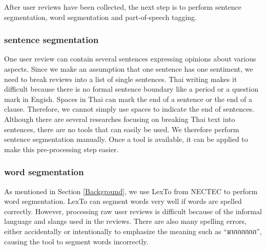 After user reviews have been collected, the next step is to perform sentence segmentation, word segmentation and part-of-speech tagging. 

\subsubsection{sentence segmentation}
One user review can contain several sentences expressing opinions about various aspects. 
Since we make an assumption that one sentence has one sentiment, we need to break reviews into a list of single sentences. Thai writing makes it difficult because there is no formal sentence boundary like a period or a question mark in Engish. Spaces in Thai can mark the end of a sentence or the end of a clause. Therefore, we cannot simply use spaces to indicate the end of sentences. Although there are several researches focusing on breaking Thai text into sentences, there are no tools that can easily be used. We therefore perform sentence segmentation manually. Once a tool is available, it can be applied to make this pre-processing step easier. 

\subsubsection{word segmentation}
As mentioned in Section \ref{Background}, we use LexTo\cite{LexTo} from NECTEC to perform word segmentation. LexTo can segment words very well if words are spelled correctly. However, processing raw user reviews is difficult because of the informal language and slangs used in the reviews. There are also many spelling errors, either accidentally or intentionally to emphasize the meaning such as \enquote{{มากกกกกก}}, causing the tool to segment words incorrectly. 


